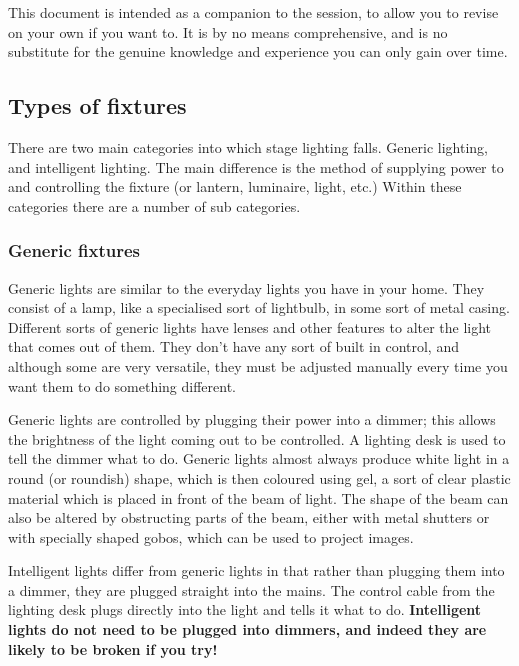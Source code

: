 \documentclass[14pt]{article} %
\begin{document}
This document is intended as a companion to the session, to allow you to revise on your own if you want to. It is by no means comprehensive, and is no substitute for the genuine knowledge and experience you can only gain over time.

\subsection{Types of fixtures}
There are two main categories into which stage lighting falls. Generic lighting, and intelligent lighting. The main difference is the method of supplying power to and controlling the fixture (or lantern, luminaire, light, etc.)
Within these categories there are a number of sub categories.

\subsubsection{Generic fixtures}
Generic lights are similar to the everyday lights you have in your home. They consist of a lamp, like a specialised sort of lightbulb, in some sort of metal casing. Different sorts of generic lights have lenses and other features to alter the light that comes out of them. They don’t have any sort of built in control, and although some are very versatile, they must be adjusted manually every time you want them to do something different.

Generic lights are controlled by plugging their power into a dimmer; this allows the brightness of the light coming out to be controlled. A lighting desk is used to tell the dimmer what to do. Generic lights almost always produce white light in a round (or roundish) shape, which is then coloured using gel, a sort of clear plastic material which is placed in front of the beam of light. The shape of the beam can also be altered by obstructing parts of the beam, either with metal shutters or with specially shaped gobos, which can be used to project images.

Intelligent lights differ from generic lights in that rather than plugging them into a dimmer, they are plugged straight into the mains. The control cable from the lighting desk plugs directly into the light and tells it what to do. 
\textbf{Intelligent lights do not need to be plugged into dimmers, and indeed they are likely to be broken if you try!}
\end{document}
